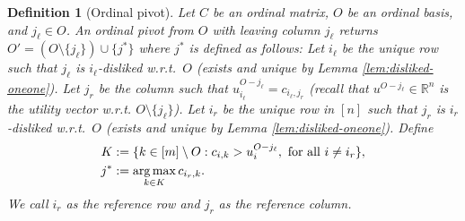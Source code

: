 \documentclass[11pt]{article}
\newtheorem{definition}[theorem]{Definition}
\begin{document}
\begin{definition}[Ordinal pivot]\label{def:appopdef}
Let $C$ be an ordinal matrix, $O$ be an ordinal basis, and $j_\ell\in O$. An \emph{ordinal pivot} from $O$ with leaving column $j_\ell$ returns $O'=(O\setminus \{j_\ell\}) \cup \{j^*\}$ where $j^*$ is defined as follows: 
Let $i_{\ell}$ be the unique row such that $j_{\ell}$ is $i_{\ell}$-disliked w.r.t.~$O$ (exists and unique by Lemma \ref{lem:disliked-oneone}). 
Let $j_r$ be the column such that $u^{O-j_\ell}_{i_\ell}=c_{i_\ell,j_r}$ (recall that $u^{O-j_\ell}\in\mathbb{R}^n$ is the utility vector w.r.t. $O\setminus\{j_\ell\}$). 
Let $i_r$ be the unique row in $[n]$ such that $j_r$ is $i_r$-disliked w.r.t.~$O$ (exists and unique by Lemma \ref{lem:disliked-oneone}). Define
\begin{align}\label{eq:appchoiceoford}
    K&:=\{k\in[m]\setminus O:c_{i,k}>u^{O-j_\ell}_i, \textrm{ for all } i\neq i_r\},\\
    j^*&:=\mathop{\arg\max}_{k\in K} c_{i_r, k}. \notag
\end{align}
We call $i_r$ as the \emph{reference row} and $j_r$ as the \emph{reference column}. 
\end{definition}

\begin{algorithm}
\caption{Ordinal Pivot}\label{alg:op}
\begin{algorithmic}
\end{algorithmic}
\end{algorithm}
\end{document}
